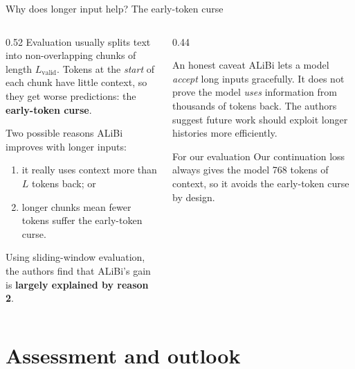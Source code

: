 \documentclass[aspectratio=169,11pt]{beamer}
\begin{document}
\begin{frame}{Why does longer input help? The early-token curse}
  \begin{columns}[T]
    \begin{column}{0.52\textwidth}
      \small
      Evaluation usually splits text into non-overlapping chunks of length $L_{\text{valid}}$. Tokens at the \emph{start} of each chunk have little context, so they get worse predictions: the \textbf{early-token curse}.
      \vspace{1mm}

      Two possible reasons ALiBi improves with longer inputs:
      \begin{enumerate}
        \item it really uses context more than $L$ tokens back; or
        \item longer chunks mean fewer tokens suffer the early-token curse.
      \end{enumerate}
      Using sliding-window evaluation, the authors find that ALiBi's gain is \textbf{largely explained by reason 2}.
    \end{column}
    \begin{column}{0.44\textwidth}
      \begin{alertblock}{An honest caveat}
        \small
        ALiBi lets a model \emph{accept} long inputs gracefully. It does not prove the model \emph{uses} information from thousands of tokens back.
        The authors suggest future work should exploit longer histories more efficiently.
      \end{alertblock}
      \begin{exampleblock}{For our evaluation}
        \small
        Our continuation loss always gives the model 768 tokens of context, so it avoids the early-token curse by design.
      \end{exampleblock}
    \end{column}
  \end{columns}
\end{frame}

\section{Assessment and outlook}
\end{document}
